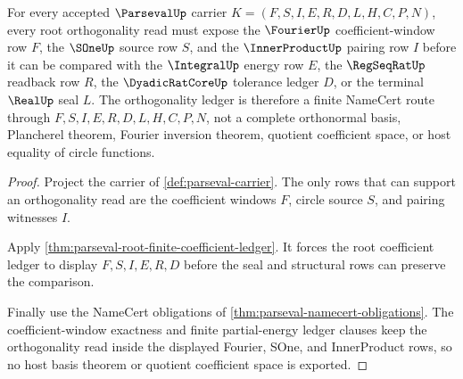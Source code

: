 \begin{theorem}
\label{thm:parseval-root-orthogonality-ledger}
For every accepted $\ParsevalUp$ carrier $K=(F,S,I,E,R,D,L,H,C,P,N)$, every root orthogonality read must expose the $\FourierUp$ coefficient-window row $F$, the $\SOneUp$ source row $S$, and the $\InnerProductUp$ pairing row $I$ before it can be compared with the $\IntegralUp$ energy row $E$, the $\RegSeqRatUp$ readback row $R$, the $\DyadicRatCoreUp$ tolerance ledger $D$, or the terminal $\RealUp$ seal $L$. The orthogonality ledger is therefore a finite NameCert route through $F,S,I,E,R,D,L,H,C,P,N$, not a complete orthonormal basis, Plancherel theorem, Fourier inversion theorem, quotient coefficient space, or host equality of circle functions.
\end{theorem}
\begin{proof}
Project the carrier of \autoref{def:parseval-carrier}. The only rows that can support an orthogonality read are the coefficient windows $F$, circle source $S$, and pairing witnesses $I$.

Apply \autoref{thm:parseval-root-finite-coefficient-ledger}. It forces the root coefficient ledger to display $F,S,I,E,R,D$ before the seal and structural rows can preserve the comparison.

Finally use the NameCert obligations of \autoref{thm:parseval-namecert-obligations}. The coefficient-window exactness and finite partial-energy ledger clauses keep the orthogonality read inside the displayed Fourier, SOne, and InnerProduct rows, so no host basis theorem or quotient coefficient space is exported.
\end{proof}


